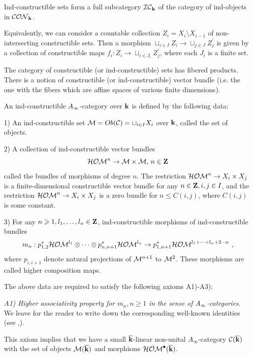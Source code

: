 \documentclass[12pt]{article}
\begin{document}
Ind-constructible sets form a full subcategory ${\cal IC}_{{\bf k}}$ of the category of ind-objects
in ${\cal CON}_{{\bf k}}$.

\begin{rmk} Equivalently, we can consider a countable collection $Z_i=X_i\setminus X_{i-1}$ of non-intersecting
constructible sets. Then a morphism $\sqcup_{i\in I}Z_i\to \sqcup_{j\in J}Z_j^{\prime}$ is given by a collection of constructible
maps $f_i:Z_i\to \sqcup_{i\in J_i}Z_j^{\prime}$, where each $J_i$ is a finite set.

\end{rmk}

The category of constructible (or ind-constructible) sets has fibered products.
 There is a notion
of constructible (or ind-constructible) vector bundle (i.e. the one with the fibers which are affine spaces of various finite dimensions). 


\begin{defn} An  ind-constructible  $A_{\infty}$-category  over ${\bf k}$ 
is defined by the following data:

1) An ind-constructible set ${\cal M}=Ob({\mathcal C})=\sqcup_{i\in I}X_i$ over ${\bf k}$, called the set of objects.




2) A collection of ind-constructible vector bundles $${\cal HOM}^n\to {\cal M}\times {\cal M}, \,n\in {\bf Z}$$
called the bundles of morphisms of degree $n$.  The restriction ${\cal HOM}^n\to X_i\times X_j$ is  a
 finite-dimensional constructible vector bundle for any $n\in {\bf Z}, i,j\in I$,
and the restriction
${\cal HOM}^n\to X_i\times X_j$ is a zero bundle for $n\le C(i,j)$, where $C(i,j)$
is some constant.


3) For any $n\geqslant 1, l_1,\dots,l_n\in {\bf Z}$,  ind-constructible  morphisms  of ind-constructible bundles
$$m_n:p_{1,2}^{\ast}{\cal HOM}^{l_1}\otimes\dots\otimes p_{n,n+1}^{\ast}{\cal HOM}^{l_n}\to p_{1,n+1}^{\ast}{\cal HOM}^{l_1+\dots+l_n+2-n}\,\,,$$
where $p_{i,i+1}$ denote natural projections
of ${\cal M}^{n+1}$ to ${\cal M}^2$. These morphisms are called higher composition maps.


\end{defn}
The above data are required to satisfy the following axioms A1)-A3):

{\it A1) Higher associativity property for $m_n, n\geqslant 1 $ in the sense of $A_{\infty}$-categories.} We leave for the reader to write down the corresponding well-known identities (see \cite{Kel},\cite{KoSo3}).

This axiom implies that we have a small ${\overline{\bf k}}$-linear non-unital $A_\infty$-category ${\mathcal C}({\overline{\bf k}})$ with the set of objects ${\cal M}({\overline{\bf k}})$ and morphisms
 ${\cal HOM}^\bullet({\overline{\bf k}})$. 
\end{document}
